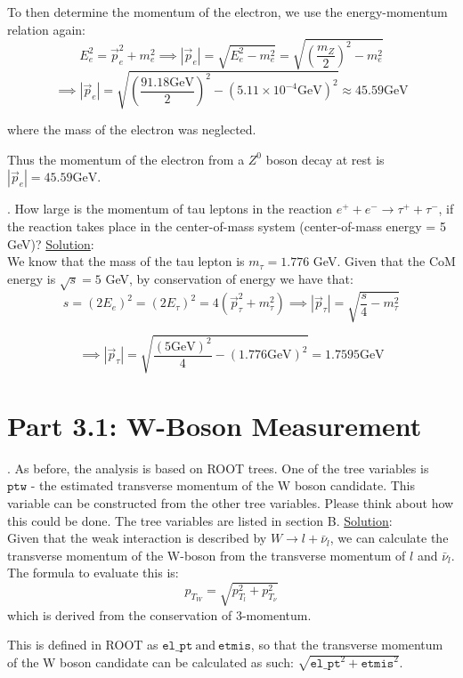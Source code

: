 \documentclass[a4paper]{report}
\numberwithin{equation}{section}
\begin{document}
\noindent To then determine the momentum of the electron, we use the energy-momentum relation again:
$$E_e^2 = \vec{p}_e^2 + m_e^2 \implies |\vec{p}_e| = \sqrt{E_e^2 - m_e^2} = \sqrt{\left(\frac{m_Z}{2}\right)^2- m_e^2}$$
$$\implies |\vec{p}_e| = \sqrt{\left(\frac{91.18 \text{GeV} }{2}\right)^2 - (5.11 \times 10^{-4} \text{GeV})^2} \approx 45.59 \text{GeV}$$

\noindent where the mass of the electron was neglected. 

\noindent Thus the momentum of the electron from a $Z^0$ boson decay at rest is $|\vec{p}_e| = 45.59 \text{GeV}$. 

\bigbreak

. How large is the momentum of tau leptons in the reaction $e^+ + e^- \rightarrow \tau^+ + \tau^-$, if the reaction takes place in the center-of-mass system (center-of-mass energy = 5 GeV)?
\bigbreak
\noindent \underline{Solution}: \\
\noindent We know that the mass of the tau lepton is $m_\tau = 1.776$ GeV. Given that the CoM energy is $\sqrt{s} = 5$ GeV, by conservation of energy we have that:
$$s = (2 E_e)^2 = (2 E_\tau)^2 = 4 (\vec{p}_\tau^2 + m_\tau^2) \implies |\vec{p}_\tau| = \sqrt{\frac{s}{4} - m_\tau^2}$$

$$
\implies |\vec{p}_\tau| = \sqrt{\frac{(5 \text{GeV})^2}{4} - (1.776 \text{GeV})^2} = 1.7595 \text{GeV}
$$

\section{Part 3.1: W-Boson Measurement}

. As before, the analysis is based on ROOT trees. One of the tree variables is $\texttt{ptw -}$  the estimated transverse momentum of the W boson candidate. This variable can be constructed from the other tree variables. Please think about how this could be done. The tree variables are listed in section B.
\bigbreak
\noindent \underline{Solution}: \\
\noindent Given that the weak interaction is described by $W \rightarrow l + \bar{\nu}_l$, we can calculate the transverse momentum of the W-boson from the transverse momentum of $l$ and $\bar{\nu}_l$.  The formula to evaluate this is:
$$p_{T_W} = \sqrt{p_{T_l}^2 + p_{T_\nu}^2}  $$
which is derived from the conservation of 3-momentum.

\noindent This is defined in ROOT as $\texttt{el\_pt} \ \text{and} \ \texttt{etmis}$, so that the transverse momentum of the W boson candidate can be calculated as such: $\sqrt{\texttt{el\_{pt}}^2 + \texttt{etmis}^2}$.
\end{document}
